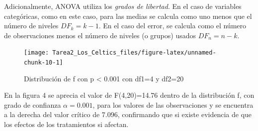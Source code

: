 \documentclass[]{article}
\begin{document}
Adicionalmente, ANOVA utiliza los \emph{grados de libertad}. En el caso
de variables categóricas, como en este caso, para las medias se calcula
como uno menos que el número de niveles \(DF_k=k-1\). En el caso del
error, se calcula como el número de observaciones menos el número de
niveles (o grupos) usados \(DF_n=n-k\).

\begin{figure}[H]

{\centering \texttt{[image: Tarea2\_Los\_Celtics\_files/figure-latex/unnamed-chunk-10-1]} 

}

\caption{Distribución de f con p < 0.001 con df1=4 y df2=20}\label{fig:unnamed-chunk-10}
\end{figure}

En la figura 4 se aprecia el valor de F(4,20)=14.76 dentro de la
distribución f, con grado de confianza \(\alpha = 0.001\), para los
valores de las observaciones y se encuentra a la derecha del valor
crítico de 7.096, confirmando que si existe evidencia de que los efectos
de los tratamientos si afectan.
\end{document}
